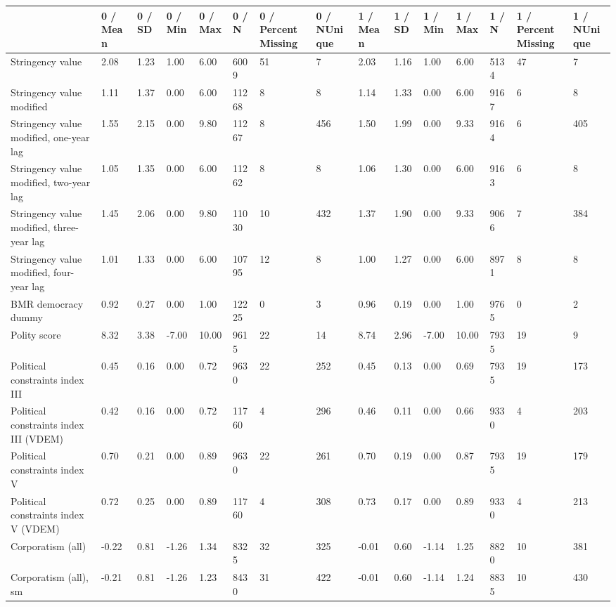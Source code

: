 
\begin{longtable}{lllllllllllllll}
\toprule
  & 0 / Mean & 0 / SD & 0 / Min & 0 / Max & 0 / N & 0 / PercentMissing & 0 / NUnique & 1 / Mean & 1 / SD & 1 / Min & 1 / Max & 1 / N & 1 / PercentMissing & 1 / NUnique\\
\midrule
Stringency value & 2.08 & 1.23 & 1.00 & 6.00 & 6009 & 51 & 7 & 2.03 & 1.16 & 1.00 & 6.00 & 5134 & 47 & 7\\
Stringency value modified & 1.11 & 1.37 & 0.00 & 6.00 & 11268 & 8 & 8 & 1.14 & 1.33 & 0.00 & 6.00 & 9167 & 6 & 8\\
Stringency value modified, one-year lag & 1.55 & 2.15 & 0.00 & 9.80 & 11267 & 8 & 456 & 1.50 & 1.99 & 0.00 & 9.33 & 9164 & 6 & 405\\
Stringency value modified, two-year lag & 1.05 & 1.35 & 0.00 & 6.00 & 11262 & 8 & 8 & 1.06 & 1.30 & 0.00 & 6.00 & 9163 & 6 & 8\\
Stringency value modified, three-year lag & 1.45 & 2.06 & 0.00 & 9.80 & 11030 & 10 & 432 & 1.37 & 1.90 & 0.00 & 9.33 & 9066 & 7 & 384\\
\addlinespace
Stringency value modified, four-year lag & 1.01 & 1.33 & 0.00 & 6.00 & 10795 & 12 & 8 & 1.00 & 1.27 & 0.00 & 6.00 & 8971 & 8 & 8\\
BMR democracy dummy & 0.92 & 0.27 & 0.00 & 1.00 & 12225 & 0 & 3 & 0.96 & 0.19 & 0.00 & 1.00 & 9765 & 0 & 2\\
Polity score & 8.32 & 3.38 & -7.00 & 10.00 & 9615 & 22 & 14 & 8.74 & 2.96 & -7.00 & 10.00 & 7935 & 19 & 9\\
Political constraints index III & 0.45 & 0.16 & 0.00 & 0.72 & 9630 & 22 & 252 & 0.45 & 0.13 & 0.00 & 0.69 & 7935 & 19 & 173\\
Political constraints index III (VDEM) & 0.42 & 0.16 & 0.00 & 0.72 & 11760 & 4 & 296 & 0.46 & 0.11 & 0.00 & 0.66 & 9330 & 4 & 203\\
\addlinespace
Political constraints index V & 0.70 & 0.21 & 0.00 & 0.89 & 9630 & 22 & 261 & 0.70 & 0.19 & 0.00 & 0.87 & 7935 & 19 & 179\\
Political constraints index V (VDEM) & 0.72 & 0.25 & 0.00 & 0.89 & 11760 & 4 & 308 & 0.73 & 0.17 & 0.00 & 0.89 & 9330 & 4 & 213\\
Corporatism (all) & -0.22 & 0.81 & -1.26 & 1.34 & 8325 & 32 & 325 & -0.01 & 0.60 & -1.14 & 1.25 & 8820 & 10 & 381\\
Corporatism (all), sm & -0.21 & 0.81 & -1.26 & 1.23 & 8430 & 31 & 422 & -0.01 & 0.60 & -1.14 & 1.24 & 8835 & 10 & 430\\

\end{longtable}
